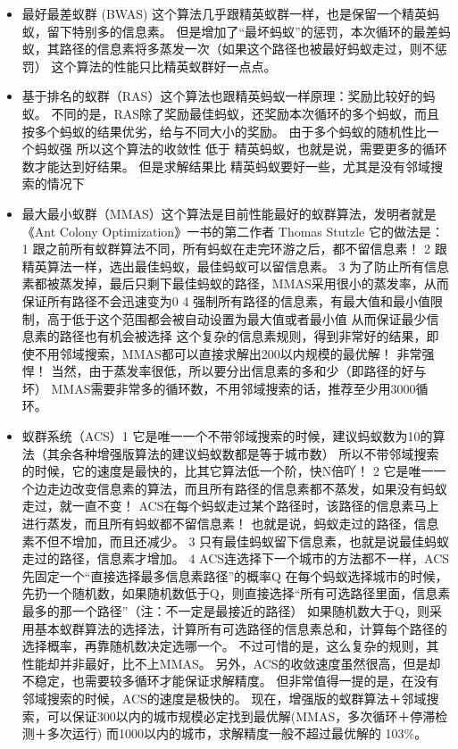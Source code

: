 \documentclass[12pt,nofonts]{ctexart}
\begin{document}
\begin{itemize}
		\item<2> 最好最差蚁群 (BWAS)
这个算法几乎跟精英蚁群一样，也是保留一个精英蚂蚁，留下特别多的信息素。
但是增加了“最坏蚂蚁”的惩罚，本次循环的最差蚂蚁，其路径的信息素将多蒸发一次（如果这个路径也被最好蚂蚁走过，则不惩罚）
这个算法的性能只比精英蚁群好一点点。
		\item<3> 基于排名的蚁群（RAS）这个算法也跟精英蚂蚁一样原理：奖励比较好的蚂蚁。
不同的是，RAS除了奖励最佳蚂蚁，还奖励本次循环的多个蚂蚁，而且按多个蚂蚁的结果优劣，给与不同大小的奖励。
由于多个蚂蚁的随机性比一个蚂蚁强
所以这个算法的收敛性 低于 精英蚂蚁，也就是说，需要更多的循环数才能达到好结果。
但是求解结果比 精英蚂蚁要好一些，尤其是没有邻域搜索的情况下
		\item<4> 最大最小蚁群（MMAS）这个算法是目前性能最好的蚁群算法，发明者就是《Ant Colony Optimization》一书的第二作者 Thomas Stutzle
它的做法是：
1 跟之前所有蚁群算法不同，所有蚂蚁在走完环游之后，都不留信息素！
2 跟精英算法一样，选出最佳蚂蚁，最佳蚂蚁可以留信息素。
3 为了防止所有信息素都被蒸发掉，最后只剩下最佳蚂蚁的路径，MMAS采用很小的蒸发率，从而保证所有路径不会迅速变为0
4 强制所有路径的信息素，有最大值和最小值限制，高于低于这个范围都会被自动设置为最大值或者最小值
从而保证最少信息素的路径也有机会被选择
这个复杂的信息素规则，得到非常好的结果，即使不用邻域搜索，MMAS都可以直接求解出200以内规模的最优解！
非常强悍！
当然，由于蒸发率很低，所以要分出信息素的多和少（即路径的好与坏）
MMAS需要非常多的循环数，不用邻域搜索的话，推荐至少用3000循环。
		\item<5> 蚁群系统（ACS）1 它是唯一一个不带邻域搜索的时候，建议蚂蚁数为10的算法（其余各种增强版算法的建议蚂蚁数都是等于城市数）
所以不带邻域搜索的时候，它的速度是最快的，比其它算法低一个阶，快N倍吖！
2 它是唯一一个边走边改变信息素的算法，而且所有路径的信息素都不蒸发，如果没有蚂蚁走过，就一直不变！
ACS在每个蚂蚁走过某个路径时，该路径的信息素马上进行蒸发，而且所有蚂蚁都不留信息素！
也就是说，蚂蚁走过的路径，信息素不但不增加，而且还减少。
3 只有最佳蚂蚁留下信息素，也就是说最佳蚂蚁走过的路径，信息素才增加。
4 ACS连选择下一个城市的方法都不一样，ACS先固定一个“直接选择最多信息素路径”的概率Q
在每个蚂蚁选择城市的时候，先扔一个随机数，如果随机数低于Q，则直接选择“所有可选路径里面，信息素最多的那一个路径”（注：不一定是最接近的路径）
如果随机数大于Q，则采用基本蚁群算法的选择法，计算所有可选路径的信息素总和，计算每个路径的选择概率，再靠随机数决定选哪一个。
不过可惜的是，这么复杂的规则，其性能却并非最好，比不上MMAS。
另外，ACS的收敛速度虽然很高，但是却不稳定，也需要较多循环才能保证求解精度。
但非常值得一提的是，在没有邻域搜索的时候，ACS的速度是极快的。
现在，增强版的蚁群算法＋邻域搜索，可以保证300以内的城市规模必定找到最优解(MMAS，多次循环＋停滞检测＋多次运行)
而1000以内的城市，求解精度一般不超过最优解的 103\%。

\end{itemize}
\end{document}
